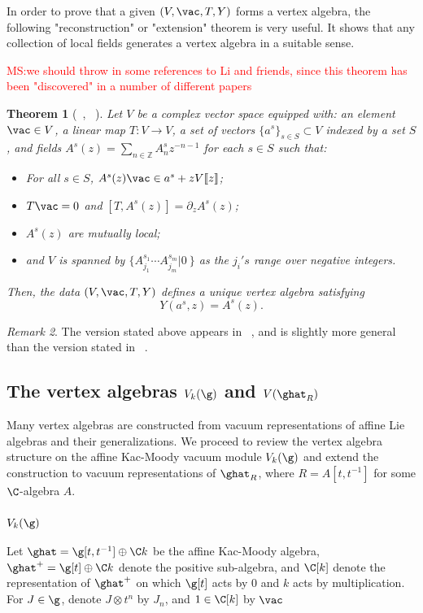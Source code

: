 \documentclass[12pt]{amsart}
\newtheorem{theorem}{Theorem}[section]
\theoremstyle{definition}
\theoremstyle{remark}
\newtheorem{rmk}[theorem]{Remark}
\newcommand{\R}{R}
\def\matt{\textcolor{red}{MS:}\textcolor{red}}
\begin{document}
In order to prove that a given $(V,\vac,T,Y)$ forms a vertex algebra, the following "reconstruction" or "extension" theorem is very useful. It shows that any collection of local fields generates a vertex algebra in a suitable sense. 

\matt{we should throw in some references to Li and friends, since this theorem has been "discovered" in a number of different papers}

\begin{theorem}[~\cite{FBZ}, ~\cite{DSK}] \label{rec_thm} Let $V$ be a complex vector space equipped with: an
  element $\vac \in V$, a linear map $T : V \to V$, a 
    set of vectors $\{a^s\}_{s \in S} \subset V$ indexed by a set $S$, and fields $A^s(z) =
    \sum_{n \in \mathbb{Z}} A_n^sz^{-n-1}$ for each $s\in S$ such that:
\begin{itemize}
\item For all $s \in S$, $A^s(z) \vac \in a^s + z V\llbracket
    z\rrbracket$;
\item $T \vac = 0$ and $[T,A^s(z)] = \partial_z A^s(z)$;
\item $A^s(z)$ are mutually local;
\item and $V$ is spanned by $\{A_{j_1}^{s_1} \cdots A_{j_m}^{s_m}
  |0\>\}$ as the $j_i's$ range over negative integers. 
\end{itemize}
Then, the data $(V,\vac, T,Y)$ defines a unique vertex algebra satisfying 
\[
Y(a^s,z) = A^s(z) .
\]
\end{theorem}

\begin{rmk}
The version stated above appears in ~\cite{DSK}, and is slightly more general than the version stated in ~\cite{FBZ}. 
\end{rmk}

\subsection{The vertex algebras $V_{k}(\g)$ and $V(\ghat_{\R})$}

Many vertex algebras are constructed from vacuum representations of affine Lie algebras and their generalizations. We proceed to review the vertex algebra structure on the affine Kac-Moody vacuum module $V_{k}(\g)$ and extend the construction to vacuum representations of $\ghat_{R}$, where $R=A[t,t^{-1}]$ for some $\C$-algebra $A$.

\subsubsection{$V_{k}(\g)$}
Let $\ghat = \g[t,t^{-1}] \oplus \C k$ be the affine Kac-Moody algebra, $\ghat^{+} = \g[t] \oplus \C k$ denote the positive sub-algebra, and $\C[k]$ denote the representation of $\ghat^{+}$ on which $\g[t]$ acts by $0$ and $k$ acts by multiplication. For $J \in \g$, denote $J \otimes t^n$ by $J_n$, and $1 \in \C[k]$ by $\vac$
\end{document}
